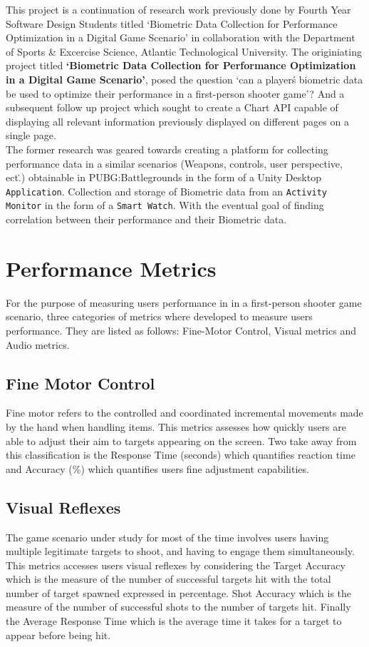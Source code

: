     This project is a continuation of research work previously done by Fourth Year Software Design Students titled `Biometric 
    Data Collection for Performance Optimization in a Digital Game Scenario' in collaboration with the Department of Sports
     \& Excercise Science, Atlantic Technological University.
    The originiating project titled \textbf{`Biometric Data Collection for Performance Optimization in a Digital
    Game Scenario'}, posed the question `can a player\'s biometric data be used to optimize their performance in a 
    first-person shooter game'? And a subsequent follow up project which sought to create a Chart API capable of displaying 
    all relevant information previously displayed on different pages on a single page.\\
    The former research was geared towards creating a platform for collecting performance data in a similar scenarios 
    (Weapons, controls, user perspective, ect\..) obtainable in PUBG\::Battlegrounds in the form of a Unity Desktop 
    {\tt Application}. Collection and storage of Biometric data from an 
    {\tt Activity Monitor} in the form of a {\tt Smart Watch}. With the eventual goal of finding correlation between their
    performance and their Biometric data. 


    \section{Performance Metrics}
    For the purpose of measuring users performance in in a first-person shooter game scenario, three categories of metrics where
    developed to measure users performance. They are listed as follows: Fine-Motor Control, Visual metrics and Audio metrics. 
    \subsection{Fine Motor Control}  Fine motor refers to the controlled and coordinated incremental movements made by the hand
    when handling items. This metrics assesses how quickly users are able to adjust their aim to targets appearing on the screen.
    Two take away from this classification is the Response Time (seconds) which quantifies reaction time and Accuracy (\%) which 
    quantifies users fine adjustment capabilities. 
    \subsection{Visual Reflexes} The game scenario under study for most of the time involves users having multiple legitimate targets
    to shoot, and having to engage them simultaneously. This metrics accesses users visual reflexes by considering the Target 
    Accuracy which is the measure of the number of successful targets hit with the total number of target spawned expressed in 
    percentage. Shot Accuracy which is the measure of the number of successful shots to the number of targets hit. Finally the 
    Average Response Time which is the average time it takes for a target to appear before being hit.
